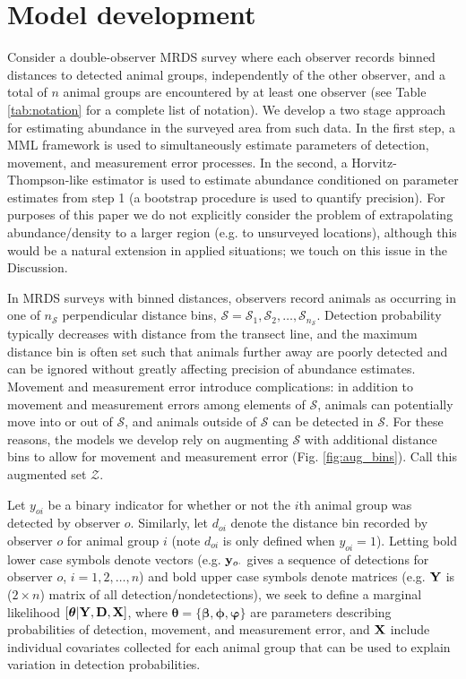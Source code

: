 \documentclass[aoas,preprint]{imsart}
\numberwithin{equation}{section}
\theoremstyle{plain}
\begin{document}
\section{Model development}


Consider a double-observer MRDS survey where each observer records binned distances to detected animal groups, independently of the other observer, and a total of $n$ animal groups are encountered by at least one observer (see Table \ref{tab:notation} for a complete list of notation).  We develop a two stage approach for estimating abundance in the surveyed area from such data.  In the first step, a MML framework is used to simultaneously estimate parameters of detection, movement, and measurement error processes.  In the second, a Horvitz-Thompson-like estimator is used to estimate abundance conditioned on parameter estimates from step 1 (a bootstrap procedure is used to quantify precision).  For purposes of this paper we do not explicitly consider the problem of extrapolating abundance/density to a larger region (e.g. to unsurveyed locations), although this would be a natural extension in applied situations; we touch on this issue in the Discussion.

In MRDS surveys with binned distances, observers record animals as occurring in one of $n_\mathcal{S}$ perpendicular distance bins, $\mathcal{S} = \mathcal{S}_1,\mathcal{S}_2,\hdots,\mathcal{S}_{n_\mathcal{S}}$.  Detection probability typically decreases with distance from the transect line, and the maximum distance bin is often set such that animals further away are poorly detected and can be ignored without greatly affecting precision of abundance estimates.  Movement and measurement error introduce complications: in addition to movement and measurement errors among elements of $\mathcal{S}$, animals can potentially move into or out of $\mathcal{S}$, and animals outside of $\mathcal{S}$ can be detected in $\mathcal{S}$.  For these reasons, the models we develop rely on augmenting $\mathcal{S}$ with additional distance bins to allow for movement and measurement error (Fig. \ref{fig:aug_bins}).  Call this augmented set $\mathcal{Z}$.

Let $y_{oi}$ be a binary indicator for whether or not the $i$th animal group was detected by observer $o$.  Similarly, let $d_{oi}$ denote the distance bin recorded by observer $o$ for animal group $i$ (note $d_{oi}$ is only defined when $y_{oi}=1$). Letting bold lower case symbols denote vectors (e.g. ${\bf y}_{o \cdot}$ gives a sequence of detections for observer $o$, $i=1,2,\hdots,n$) and bold upper case symbols denote matrices (e.g. ${\bf Y}$ is ($2 \times n$) matrix of all detection/nondetections),  we seek to define a marginal likelihood $[\boldsymbol{\theta} | {\bf Y},{\bf D}, {\bf X}]$, where $\boldsymbol{\theta}= \{ \boldsymbol{\beta,\phi,\varphi} \}$ are parameters describing probabilities of detection, movement, and measurement error, and ${\bf X}$ include individual covariates collected for each animal group that can be used to explain variation in detection probabilities.
\end{document}
